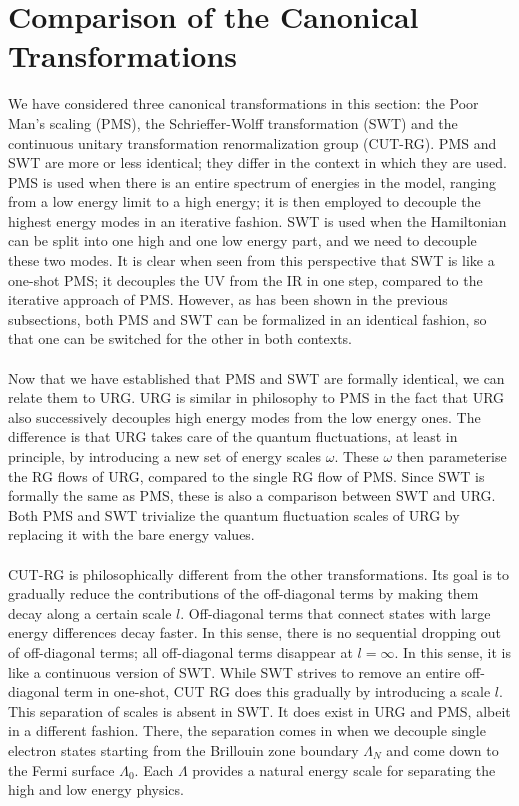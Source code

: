 \documentclass[twoside,11pt]{report}
\numberwithin{equation}{section}
\begin{document}
\section{Comparison of the Canonical Transformations}
We have considered three canonical transformations in this section: the Poor Man's scaling (PMS), the Schrieffer-Wolff transformation (SWT) and the continuous unitary transformation renormalization group (CUT-RG). PMS and SWT are more or less identical; they differ in the context in which they are used. PMS is used when there is an entire spectrum of energies in the model, ranging from a low energy limit to a high energy; it is then employed to decouple the highest energy modes in an iterative fashion. SWT is used when the Hamiltonian can be split into one high and one low energy part, and we need to decouple these two modes. It is clear when seen from this perspective that SWT is like a one-shot PMS; it decouples the UV from the IR in one step, compared to the iterative approach of PMS. However, as has been shown in the previous subsections, both PMS and SWT can be formalized in an identical fashion, so that one can be switched for the other in both contexts.
\\\\Now that we have established that PMS and SWT are formally identical, we can relate them to URG. URG is similar in philosophy to PMS in the fact that URG also successively decouples high energy modes from the low energy ones. The difference is that URG takes care of the quantum fluctuations, at least in principle, by introducing a new set of energy scales \(\omega\). These \(\omega\) then parameterise the RG flows of URG, compared to the single RG flow of PMS. Since SWT is formally the same as PMS, these is also a comparison between SWT and URG. Both PMS and SWT trivialize the quantum fluctuation scales of URG by replacing it with the bare energy values.
\\\\CUT-RG is philosophically different from the other transformations. Its goal is to gradually reduce the contributions of the off-diagonal terms by making them decay along a certain scale \(l\). Off-diagonal terms that connect states with large energy differences decay faster. In this sense, there is no sequential dropping out of off-diagonal terms; all off-diagonal terms disappear at \(l=\infty\). In this sense, it is like a continuous version of SWT. While SWT strives to remove an entire off-diagonal term in one-shot, CUT RG does this gradually by introducing a scale \(l\). This separation of scales is absent in SWT. It does exist in URG and PMS, albeit in a different fashion. There, the separation comes in when we decouple single electron states starting from the Brillouin zone boundary \(\Lambda_N\) and come down to the Fermi surface \(\Lambda_0\). Each \(\Lambda\) provides a natural energy scale for separating the high and low energy physics.
\end{document}
